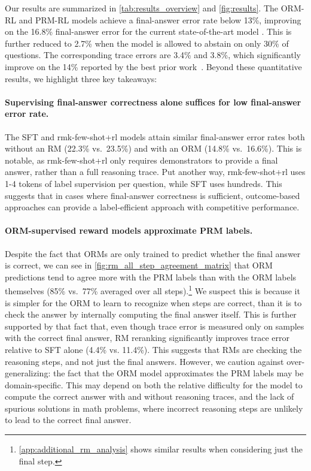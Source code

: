 \documentclass[11pt, a4paper, logo]{deepmind}
\newcommand{\ORM}{ORM}
\newcommand{\PRM}{PRM}
\newcommand{\Short}[1]{\csname rmk-#1\endcsname}
\newcommand{\ormrl}{ORM-RL}
\newcommand{\prmrl}{PRM-RL}
\begin{document}
Our results are summarized in \cref{tab:results_overview} and \cref{fig:results}.
The \ormrl{} and \prmrl{} models achieve a final-answer error rate below 13\%, improving on the 16.8\% final-answer error for the current state-of-the-art model \citep{li2022advance}. This is further reduced to 2.7\% when the model is allowed to abstain on only 30\% of questions. The corresponding trace errors are 3.4\% and 3.8\%, which significantly improve on the 14\% reported by the best prior work~\citep{wang2022self, wei2022chain}. 
Beyond these quantitative results, we highlight three key takeaways:

\paragraph{Supervising final-answer correctness alone suffices for low final-answer error rate.}
The SFT and \Short{few-shot+rl} models attain similar final-answer error rates both without an RM (22.3\% vs.\ 23.5\%) and with an \ORM{} (14.8\% vs.\ 16.6\%).
This is notable, as \Short{few-shot+rl} only requires demonstrators to provide a final answer, rather than a full reasoning trace.
Put another way, \Short{few-shot+rl} uses 1-4 tokens of label supervision per question, while SFT uses hundreds.
This suggests that in cases where final-answer correctness is sufficient, outcome-based approaches can provide a label-efficient approach with competitive performance.


\paragraph{\ORM{}-supervised reward models approximate \PRM{} labels.}
Despite the fact that ORMs are only trained to predict whether the final answer is correct, we can see in \cref{fig:rm_all_step_agreement_matrix} that ORM predictions tend to agree more with the PRM labels than with the ORM labels themselves (85\% vs.\ 77\% averaged over all steps).\footnote{\cref{app:additional_rm_analysis} shows similar results when considering just the final step.} We suspect this is because it is simpler for the \ORM{} to learn to recognize when steps are correct, than it is to check the answer by internally computing the final answer itself.  This is further supported by that fact that, even though trace error is measured only on samples with the correct final answer, RM reranking significantly improves trace error relative to SFT alone (4.4\% vs. 11.4\%). This suggests that RMs are checking the reasoning steps, and not just the final answers.
However, we caution against over-generalizing: the fact that the \ORM{} model approximates the \PRM{} labels may be domain-specific. This may depend on both the relative difficulty for the model to compute the correct answer with and without reasoning traces, and the lack of spurious solutions \citep{goldman2017weakly} in math problems, where incorrect reasoning steps are unlikely to lead to the correct final answer.
\end{document}
